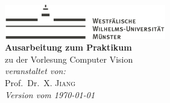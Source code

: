 
\begin{titlepage}
\begin{center}
\includegraphics[height=1.5cm, keepaspectratio]{images/Logo_WWU_Muenster.pdf} \\[1.0cm]
	{\Huge\sffamily\bfseries Ausarbeitung zum Praktikum}\\[.8cm]
	{\large zu der Vorlesung  Computer Vision}\\[7pt]
	
	{\large \textit{veranstaltet von:}}\\[5pt]
	{\Large Prof.\ Dr.\ X. \textsc{Jiang}}\\[4pt]

	{\large\itshape Version vom \today}\\[1.5cm]
\end{center}
\end{titlepage}
